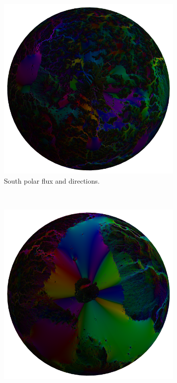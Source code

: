 \documentclass[12pt]{iopart}
\numberwithin{equation}{section}
\begin{document}
\begin{figure}
    \centering
    \begin{subfigure}[b]{0.48\textwidth}
        \includegraphics[width=\textwidth]{FlowSouthPoleFixed.png}
        \caption{\small{South polar flux and directions.}}
        \label{fig:SouthPoleFlux}
    \end{subfigure}
    ~
    \begin{subfigure}[b]{0.48\textwidth}
      \includegraphics[width=\textwidth]{FlowNorthPoleFixed.png}

\end{subfigure}
\end{figure}
\end{document}
